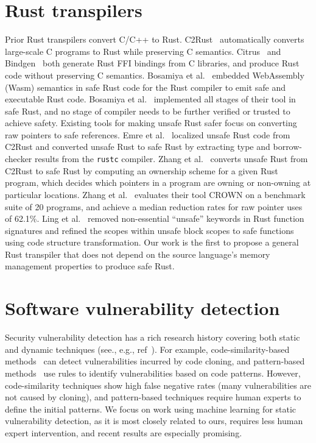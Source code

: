 \documentclass[12pt,openany,oneside,table]{cmuthesis}
\begin{document}
\section{Rust transpilers}
Prior Rust transpilers convert C/C++ to Rust.  C2Rust~\cite{C2Rust}
automatically converts large-scale C programs to Rust while preserving
C semantics. Citrus~\cite{citrus} and Bindgen~\cite{bindgen} both
generate Rust FFI bindings from C libraries, and produce Rust code
without preserving C semantics. Bosamiya et
al.~\cite{bosamiya2022provably} embedded WebAssembly (Wasm) semantics
in safe Rust code for the Rust compiler to emit safe and executable
Rust code. Bosamiya et al.~\cite{bosamiya2022provably} implemented all
stages of their tool in safe Rust, and no stage of compiler needs to
be further verified or trusted to achieve safety.
Existing tools for making unsafe Rust safer focus on converting raw
pointers to safe references. Emre et al.~\cite{emre2021translating}
localized unsafe Rust code from C2Rust and converted unsafe Rust to
safe Rust by extracting type and borrow-checker results from the
\texttt{rustc} compiler. Zhang et al.~\cite{zhang2023ownership}
converts unsafe Rust from C2Rust to safe Rust by computing an
ownership scheme for a given Rust program, which decides which
pointers in a program are owning or non-owning at particular
locations. Zhang et al.~\cite{zhang2023ownership} evaluates their tool
CROWN on a benchmark suite of 20 programs, and achieve a median
reduction rates for raw pointer uses of 62.1\%.  Ling et
al.~\cite{ling2022rust} removed non-essential ``unsafe'' keywords in
Rust function signatures and refined the scopes within unsafe block
scopes to safe functions using code structure transformation. Our work
is the first to propose a general Rust transpiler that does not depend
on the source language's memory management properties to produce safe
Rust.
\section{Software vulnerability detection}
Security vulnerability detection has a rich research history covering both static and dynamic techniques (see., e.g., ref~\cite{sokMemory,secVulSurvey,fuzzingSurvey}). 
For example, code-similarity-based methods~\cite{vuddy, vulpecker} can detect vulnerabilities incurred by code cloning, and pattern-based methods~\cite{neuhaus2007predicting, chucky} use rules to identify vulnerabilities based on code patterns. However, code-similarity techniques show high false negative rates (many vulnerabilities are not caused by cloning), 
and pattern-based techniques require human experts to define the initial patterns. 
We focus on work using machine learning for static vulnerability detection, as it is most closely related to ours, requires less human expert intervention, and recent results are especially promising.
\end{document}
